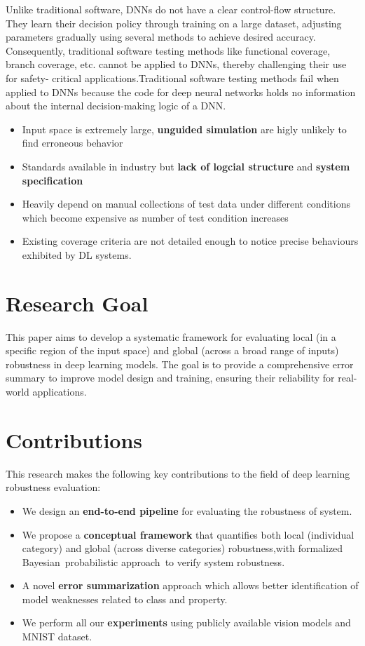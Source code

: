 \documentclass[10pt, conference, a4paper, final]{IEEEtran}
\begin{document}
Unlike traditional software, DNNs do not have a clear control-flow structure. They learn their decision policy through training on a large dataset, adjusting parameters gradually using several methods to achieve desired accuracy. Consequently, traditional software testing methods like functional coverage, branch coverage, etc. cannot be applied to DNNs, thereby challenging their use for safety- critical applications.Traditional software testing methods fail when applied to DNNs because the code for deep neural networks holds no information about the internal decision-making logic of a DNN.
\begin{itemize}
    \item Input space is extremely large, \textbf{unguided simulation} are higly unlikely to find erroneous behavior
    \item Standards available in industry but \textbf{lack of logcial structure} and \textbf{system specification}  
     \item Heavily depend on manual collections of test data under different conditions which become expensive as number of test condition increases
     \item  Existing coverage criteria are not detailed enough to notice precise behaviours exhibited by DL systems.
\end{itemize}

\section{Research Goal}
This paper aims to develop a systematic framework for evaluating local (in a specific region of the input space) and global (across a broad range of inputs) robustness in deep learning models. 
The goal is to provide a comprehensive error summary to improve model design and training, ensuring their reliability for real-world applications.

\section{Contributions}
This research makes the following key contributions to the field of deep learning robustness evaluation:
\begin{itemize}
   
    \item We design an \textbf{end-to-end pipeline} for evaluating the robustness of system.
    
    \item We propose a \textbf{conceptual framework} that quantifies both local (individual category) and global (across diverse categories) robustness,with formalized Bayesian probabilistic approach to verify system robustness.
    \item A novel \textbf{error summarization}  approach which allows better identification of model weaknesses related to class and property.

    \item We perform all our \textbf{experiments} using publicly available vision models and MNIST dataset.
\end{itemize}
\end{document}
